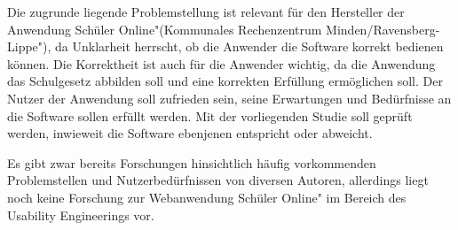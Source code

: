 \pagebreak
%
%




Die zugrunde liegende Problemstellung ist relevant für den Hersteller der Anwendung \glqq Schüler Online"(\glqq Kommunales Rechenzentrum Minden/Ravensberg-Lippe"), da Unklarheit herrscht, ob die Anwender die Software korrekt bedienen können. Die Korrektheit ist auch für die Anwender wichtig, da die Anwendung das Schulgesetz abbilden soll und eine korrekten Erfüllung ermöglichen soll. Der Nutzer der Anwendung soll zufrieden sein, seine Erwartungen und Bedürfnisse an die Software sollen erfüllt werden. Mit der vorliegenden Studie soll geprüft werden, inwieweit die Software ebenjenen entspricht oder abweicht.

Es gibt zwar bereits Forschungen hinsichtlich häufig vorkommenden Problemstellen und Nutzerbedürfnissen von diversen Autoren, 
allerdings liegt noch keine Forschung zur Webanwendung \glqq Schüler Online" im Bereich des Usability Engineerings vor. 
